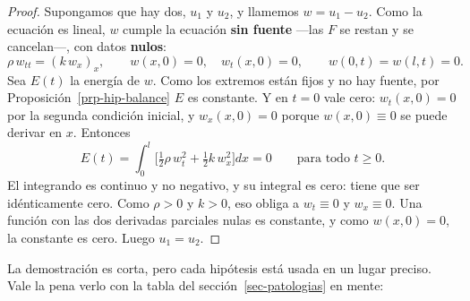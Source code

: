 \documentclass[
  spanish,
  a4paper,
]{scrbook}
\theoremstyle{definition}
\theoremstyle{plain}
\theoremstyle{definition}
\theoremstyle{plain}
\theoremstyle{definition}
\theoremstyle{remark}
\begin{document}
\begin{proof}
Supongamos que hay dos, \(u_1\) y \(u_2\), y llamemos \(w = u_1 - u_2\).
Como la ecuación es lineal, \(w\) cumple la ecuación \textbf{sin fuente}
---las \(F\) se restan y se cancelan---, con datos \textbf{nulos}: \[
\rho\,w_{tt} = (k\,w_x)_x, \qquad w(x,0) = 0,\quad w_t(x,0) = 0, \qquad w(0,t) = w(l,t) = 0 .
\] Sea \(E(t)\) la energía de \(w\). Como los extremos están fijos y no
hay fuente, por Proposición~\ref{prp-hip-balance} \(E\) es constante. Y
en \(t=0\) vale cero: \(w_t(x,0) = 0\) por la segunda condición inicial,
y \(w_x(x,0) = 0\) porque \(w(x,0)\equiv0\) se puede derivar en \(x\).
Entonces \[
E(t) = \int_0^l \Big[\tfrac12\rho\,w_t^2 + \tfrac12 k\,w_x^2\Big]dx = 0 \qquad\text{para todo } t\ge0 .
\] El integrando es continuo y no negativo, y su integral es cero: tiene
que ser idénticamente cero. Como \(\rho>0\) y \(k>0\), eso obliga a
\(w_t\equiv0\) y \(w_x\equiv0\). Una función con las dos derivadas
parciales nulas es constante, y como \(w(x,0)=0\), la constante es cero.
Luego \(u_1 = u_2\).
\end{proof}

La demostración es corta, pero cada hipótesis está usada en un lugar
preciso. Vale la pena verlo con la tabla del
sección~\ref{sec-patologias} en mente:
\end{document}
